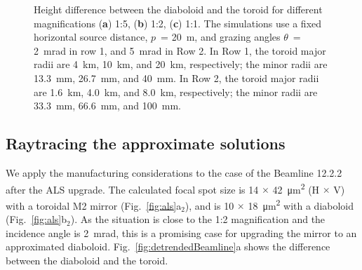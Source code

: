 \documentclass[preprint]{iucr}       %
\newcommand{\inred}[1]{{\color{red}#1}}
\begin{document}
\begin{figure}
\caption{Height difference between the diaboloid and the toroid for different magnifications (\textbf{a}) 1:5, (\textbf{b}) 1:2, (\textbf{c}) 1:1. The simulations use a fixed \inred{horizontal} source distance, $p$~= \SI{20}{\meter}, and grazing angles $\theta$~= \SI{2}{\milli\radian} in row 1, and \SI{5}{\milli\radian} in Row 2. In Row 1, the toroid major radii are \SI{4}{\kilo\meter}, \SI{10}{\kilo\meter}, and \SI{20}{\kilo\meter}, respectively; the minor radii are \SI{13.3}{\milli\meter}, \SI{26.7}{\milli\meter}, and \SI{40}{\milli\meter}. In Row 2, the toroid major radii are \SI{1.6}{\kilo\meter}, \SI{4.0}{\kilo\meter}, and \SI{8.0}{\kilo\meter}, respectively; the minor radii are \SI{33.3}{\milli\meter}, \SI{66.6}{\milli\meter}, and \SI{100}{\milli\meter}.}
\end{figure}

\subsection{Raytracing the approximate solutions}
We apply the manufacturing considerations to the case of the Beamline 12.2.2 after the ALS upgrade. The calculated focal spot size is 14 $\times$ \SI{42}{\micro\meter^2} (H $\times$ V) with a toroidal M2 mirror (Fig.~\ref{fig:als}a$_2$), and is 10 $\times$ \SI{18}{\micro\meter^2} with a diaboloid (Fig.~\ref{fig:als}b$_2$). As the situation is close to the 1:2 magnification and the incidence angle is \SI{2}{\milli\radian}, this is a promising case for upgrading the mirror to an approximated diaboloid. Fig.~\ref{fig:detrendedBeamline}a shows the difference between the diaboloid and the toroid. 
\end{document}
